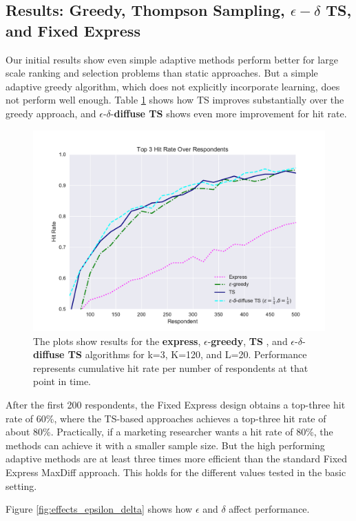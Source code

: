 \documentclass[nonblindrev]{informs3}
\newcommand{\fixedexpress}{\textbf{express}}
\newcommand{\egreedy}{$\epsilon$-\textbf{greedy}}
\newcommand{\ts}{\textbf{TS} }
\newcommand{\edts}{$\epsilon$-$\delta$-\textbf{diffuse TS} }
\begin{document}
\subsection{Results: Greedy, Thompson Sampling, $\epsilon-\delta$ TS, and Fixed Express}

Our initial results show even simple adaptive methods perform better for large scale ranking and selection problems than static approaches. But a simple adaptive greedy algorithm, which does not explicitly incorporate learning, does not perform well enough. Table \ref{fig:simple_result} shows how TS improves substantially over the greedy approach, and \edts shows even more improvement for hit rate.

\begin{figure}
\caption{The plots show results for the \fixedexpress, \egreedy, \ts, and \edts algorithms for k=3, K=120, and L=20. Performance represents cumulative hit rate per number of respondents at that point in time.}
\label{fig:simple_result}
\begin{center}
	\includegraphics[width=.8\textwidth]{plots/hr120v20k3.pdf}
\end{center}
\end{figure}

After the first 200 respondents, the Fixed Express design obtains a top-three hit rate of 60\%, where the TS-based approaches achieves a top-three hit rate of about 80\%. Practically, if a marketing researcher wants a hit rate of 80\%, the methods can achieve it with a smaller sample size. But the high performing adaptive methods are at least three times more efficient than the standard Fixed Express MaxDiff approach. This holds for the different values tested in the basic setting. 

Figure \ref{fig:effects_epsilon_delta} shows how $\epsilon$ and $\delta$ affect performance. 
\end{document}
